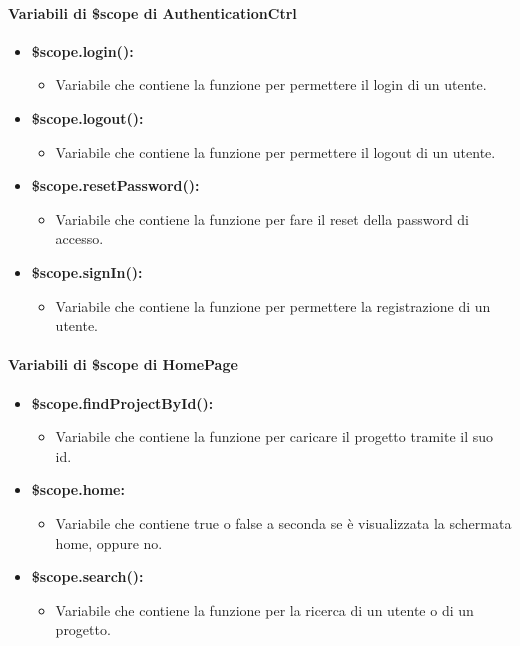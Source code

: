 \paragraph{Variabili di \$scope di AuthenticationCtrl}
\begin{itemize}
	\item \textbf{\$scope.login():}
	\begin{itemize}
		\item Variabile che contiene la funzione per permettere il login di un utente.
	\end{itemize}
	
	\item \textbf{\$scope.logout():}
	\begin{itemize}
		\item Variabile che contiene la funzione per permettere il logout di un utente.
	\end{itemize}
	
	\item \textbf{\$scope.resetPassword():}
	\begin{itemize}
		\item Variabile che contiene la funzione per fare il reset della password di accesso.
	\end{itemize}
	
	\item \textbf{\$scope.signIn():}
	\begin{itemize}
		\item Variabile che contiene la funzione per permettere la registrazione di un utente.
	\end{itemize}
\end{itemize}


\paragraph{Variabili di \$scope di HomePage}
\begin{itemize}
	\item \textbf{\$scope.findProjectById():}
	\begin{itemize}
		\item Variabile che contiene la funzione per caricare il progetto tramite il suo id.
	\end{itemize}
	
	\item \textbf{\$scope.home:}
	\begin{itemize}
		\item Variabile che contiene true o false a seconda se è visualizzata la schermata home, oppure no.
	\end{itemize}
	
	\item \textbf{\$scope.search():}
	\begin{itemize}
		\item Variabile che contiene la funzione per la ricerca di un utente o di un progetto.
	\end{itemize}
\end{itemize}


